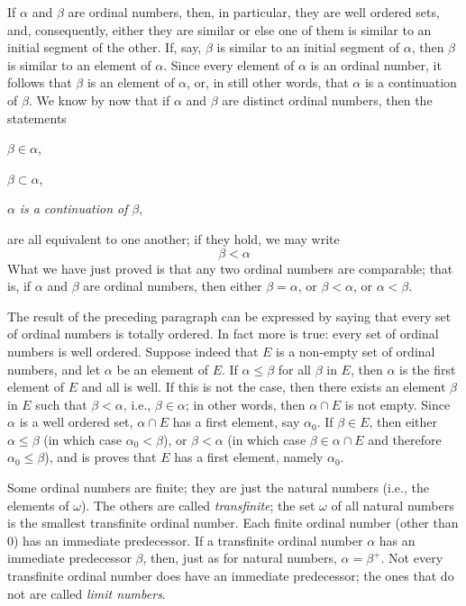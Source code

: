 If $\alpha$ and $\beta$ are ordinal numbers, then, in particular, they are well ordered sets, and, consequently, either they are similar or else one of them is similar to an initial segment of the other. If, say, $\beta$ is similar to an initial segment of $\alpha$, then $\beta$ is similar to an element of $\alpha$. Since every element of $\alpha$ is an ordinal number, it follows that $\beta$ is an element of $\alpha$, or, in still other words, that $\alpha$ is a continuation of $\beta$. We know by now that if $\alpha$ and $\beta$ are distinct ordinal numbers, then the statements 
\begin{center}
$\beta \in \alpha$,

$\beta \subset \alpha$,

$\alpha$ \textit{is a continuation of} $\beta$,
\end{center}
are all equivalent to one another; if they hold, we may write
\begin{equation*}
\beta < \alpha
\end{equation*}
What we have just proved is that any two ordinal numbers are comparable; that is, if $\alpha$ and $\beta$ are ordinal numbers, then either $\beta = \alpha$, or $\beta < \alpha$, or $\alpha < \beta$. 

The result of the preceding paragraph can be expressed by saying that every set of ordinal numbers is totally ordered. In fact more is true: every set of ordinal numbers is well ordered. Suppose indeed that $E$ is a non-empty set of ordinal numbers, and let $\alpha$ be an element of $E$. If $\alpha \le  \beta$ for all $\beta$ in $E$, then $\alpha$ is the first element of $E$ and all is well. If this is not the case, then there exists an element $\beta$ in $E$ such that $\beta < \alpha$, i.e., $\beta \in \alpha$; in other words, then $\alpha \cap E$ is not empty. Since $\alpha$ is a well ordered set, $\alpha \cap E$ has a first element, say $\alpha_{0}$. If $\beta \in E$, then either $\alpha \le \beta$ (in which case $\alpha_{0} < \beta$), or $\beta < \alpha$ (in which case $\beta \in \alpha \cap E$ and therefore $\alpha_{0} \le \beta$), and is proves that $E$ has a first element, namely $\alpha_{0}$.

Some ordinal numbers are finite; they are just the natural numbers (i.e., the elements of $\omega$). The others are called \textit{transfinite}; the set $\omega$ of all natural numbers is the smallest transfinite ordinal number. Each finite ordinal number (other than $0$) has an immediate predecessor. If a transfinite ordinal number $\alpha$ has an immediate predecessor $\beta$, then, just as for natural numbers, $\alpha = \beta^{+}$. Not every transfinite ordinal number does have an immediate predecessor; the ones that do not are called \textit{limit numbers}. 

